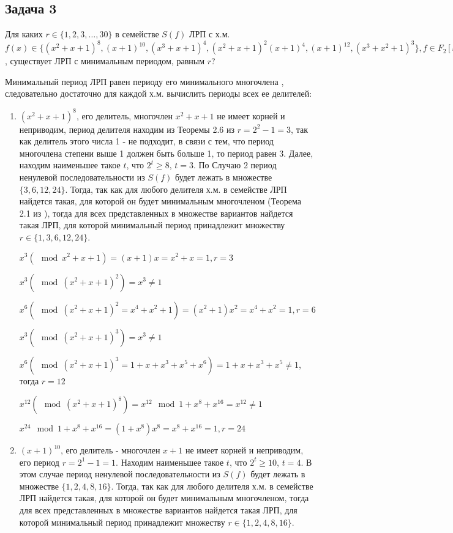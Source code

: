 \documentclass[utf8x, 14pt]{G7-32} %
\begin{document}
\subsection{Задача 3}
Для каких $r\in\{1,2,3,…,30\}$ в семействе $S(f)$ ЛРП с х.м. $f(x)\in\{(x^2+x+1)^8, (x+1)^{10}, (x^3+x+1)^4, (x^2+x+1)^2(x+1)^4, (x+1)^{12}, (x^3+x^2+1)^3\}, f\in F_2[x]$, существует ЛРП с минимальным периодом, равным $r$?

Минимальный период ЛРП равен периоду его минимального многочлена \cite{hse:Teoria_Gener}, следовательно достаточно для каждой х.м. вычислить периоды всех ее делителей:

\begin{enumerate}
    \item $(x^2+x+1)^8$, его делитель, многочлен $x^2+x+1$ не имеет корней и неприводим, период делителя находим из Теоремы 2.6 из \cite{hse:Teoria_Gener} $r = 2^2 -1 = 3$, так как делитель этого числа 1 - не подходит, в связи с тем, что период многочлена степени выше 1 должен быть больше 1, то период равен $3$. Далее, находим наименьшее такое $t$, что $2^t \geq 8$, $t=3$. По Случаю 2 период ненулевой последовательности из $S(f)$ будет лежать в множестве $\{3, 6, 12, 24\}$. Тогда, так как для любого делителя х.м. в семействе ЛРП найдется такая, для которой он будет минимальным многочленом (Теорема 2.1 из \cite{hse:Teoria_Gener}), тогда для всех представленных в множестве вариантов найдется такая ЛРП, для которой минимальный период принадлежит множеству $r \in \{1,3,6,12,24 \}$. 
    
    $x^3 (\mod x^2+x+1) = (x+1)x = x^2+x = 1, r = 3$
    
    $x^3 (\mod (x^2+x+1)^2) = x^3 \neq 1$
    
    $x^6 (\mod (x^2+x+1)^2 = x^4+x^2+1) = (x^2+1)x^2 = x^4+x^2 = 1, r = 6$
    
    $x^3 (\mod (x^2+x+1)^3) = x^3 \neq 1$
    
    $x^6 (\mod (x^2+x+1)^3 = 1 + x+ x^3+x^5+ x^6) = 1 + x+ x^3+x^5 \neq 1$, тогда $r = 12$
    
    $x^{12} (\mod (x^2+x+1)^8 ) = x^{12} \mod 1 + x^8 + x^{16} = x^{12} \neq 1$
    
    $x^{24} \mod 1 + x^8 + x^{16} = (1 + x^8) x^8 = x^8 + x^{16} = 1, r = 24$
    
    \item $(x+1)^{10}$, его делитель - многочлен $x+1$ не имеет корней и неприводим, его период $r = 2^1 -1 = 1$. Находим наименьшее такое $t$, что $2^t \geq 10$, $t=4$. В этом случае период ненулевой последовательности из $S(f)$ будет лежать в множестве $\{1, 2, 4, 8, 16\}$. Тогда, так как для любого делителя х.м. в семействе ЛРП найдется такая, для которой он будет минимальным многочленом, тогда для всех представленных в множестве вариантов найдется такая ЛРП, для которой минимальный период принадлежит множеству $r \in \{1, 2, 4, 8, 16\}$.
    

\end{enumerate}
\end{document}
